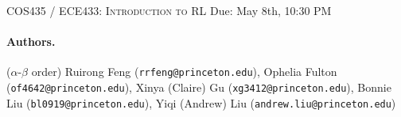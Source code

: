 \documentclass{article}
\begin{document}
\newcommand{\lectureTitle}{Reinforcement Learning for Large-Scale Auto-Bidding}
\newcommand{\lectureHeader}{RL for Large-Scale Auto-Bidding}
\newcommand{\lectureDate}{Due: May 8th, 10:30 PM}

\textsc{COS435 / ECE433: Introduction to RL} 
\vspace{1em} \hfill \lectureDate

\maketitle

\paragraph{Authors.}($\alpha$-$\beta$ order) Ruirong Feng (\texttt{rrfeng@princeton.edu}), Ophelia Fulton (\texttt{of4642@princeton.edu}),
Xinya (Claire) Gu (\texttt{xg3412@princeton.edu}),
Bonnie Liu (\texttt{bl0919@princeton.edu}),
Yiqi (Andrew) Liu (\texttt{andrew.liu@princeton.edu})
\end{document}
